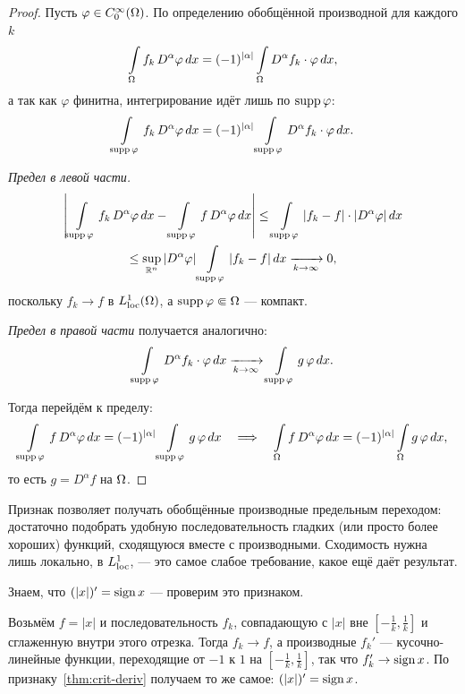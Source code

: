 \begin{proof}
Пусть $\varphi \in C_0^\infty(\Omega)$. По определению обобщённой производной для каждого $k$
\[
  \int\limits_\Omega f_k\, D^\alpha \varphi\, dx
  = (-1)^{|\alpha|} \int\limits_\Omega D^\alpha f_k \cdot \varphi\, dx ,
\]
а так как $\varphi$ финитна, интегрирование идёт лишь по $\operatorname{supp} \varphi$:
\[
  \int\limits_{\operatorname{supp} \varphi} f_k\, D^\alpha \varphi\, dx
  = (-1)^{|\alpha|} \int\limits_{\operatorname{supp} \varphi} D^\alpha f_k \cdot \varphi\, dx .
\]

\emph{Предел в левой части.}
\begin{multline*}
  \left| \int\limits_{\operatorname{supp} \varphi} f_k\, D^\alpha \varphi\, dx
       - \int\limits_{\operatorname{supp} \varphi} f\, D^\alpha \varphi\, dx \right|
  \le \int\limits_{\operatorname{supp} \varphi} |f_k - f|\cdot |D^\alpha \varphi|\, dx \\
  \le \sup_{\mathbb{R}^n} |D^\alpha \varphi| \int\limits_{\operatorname{supp} \varphi} |f_k - f|\, dx
  \xrightarrow[k \to \infty]{} 0 ,
\end{multline*}
поскольку $f_k \to f$ в $L^1_{\mathrm{loc}}(\Omega)$, а $\operatorname{supp} \varphi \Subset \Omega$ — компакт.

\emph{Предел в правой части} получается аналогично:
\[
  \int\limits_{\operatorname{supp} \varphi} D^\alpha f_k \cdot \varphi\, dx
  \xrightarrow[k \to \infty]{}
  \int\limits_{\operatorname{supp} \varphi} g\, \varphi\, dx .
\]

Тогда перейдём к пределу:
\[
  \int\limits_{\operatorname{supp} \varphi} f\, D^\alpha \varphi\, dx
  = (-1)^{|\alpha|} \int\limits_{\operatorname{supp} \varphi} g\, \varphi\, dx
  \quad\Longrightarrow\quad
  \int\limits_\Omega f\, D^\alpha \varphi\, dx
  = (-1)^{|\alpha|} \int\limits_\Omega g\, \varphi\, dx ,
\]
то есть $g = D^\alpha f$ на $\Omega$.
\end{proof}

\begin{idea}
Признак позволяет получать обобщённые производные предельным переходом: достаточно
подобрать удобную последовательность гладких (или просто более хороших) функций,
сходящуюся вместе с производными. Сходимость нужна лишь локально, в $L^1_{\mathrm{loc}}$, —
это самое слабое требование, какое ещё даёт результат.
\end{idea}

\begin{example}[$(|x|)' = \sgn x$]
Знаем, что $(|x|)' = \sgn x$ — проверим это признаком.
\end{example}

Возьмём $f = |x|$ и последовательность $f_k$, совпадающую с $|x|$ вне
$\left[-\tfrac1k, \tfrac1k\right]$ и сглаженную внутри этого отрезка.
Тогда $f_k \to f$, а производные $f_k'$ — кусочно-линейные функции, переходящие
от $-1$ к $1$ на $\left[-\tfrac1k, \tfrac1k\right]$, так что $f_k' \to \operatorname{sign} x$.
По признаку~\ref{thm:crit-deriv} получаем то же самое: $(|x|)' = \sgn x$.

